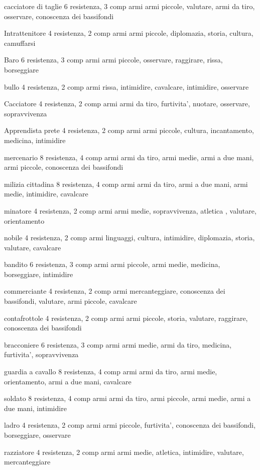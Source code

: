 \documentclass[12pt,a4paper,twoside,openany]{book}
\begin{document}
cacciatore di taglie 6 resistenza, 3 comp armi
armi piccole, valutare, armi da tiro, osservare, conoscenza dei bassifondi

Intrattenitore 4 resistenza, 2 comp armi
armi piccole, diplomazia, storia, cultura, camuffarsi

Baro  6 resistenza, 3 comp armi
armi piccole, osservare, raggirare, rissa, borseggiare

bullo 4 resistenza, 2 comp armi
rissa, intimidire, cavalcare, intimidire,  osservare

Cacciatore 4 resistenza, 2 comp armi
armi da tiro, furtivita', nuotare,  osservare, sopravvivenza

Apprendista prete 4 resistenza, 2 comp armi
armi piccole, cultura, incantamento, medicina, intimidire

mercenario 8 resistenza, 4 comp armi
armi da tiro, armi medie, armi a due mani, armi piccole, conoscenza dei bassifondi

milizia cittadina   8 resistenza, 4 comp armi
armi da tiro, armi a due mani, armi medie, intimidire, cavalcare

minatore  4 resistenza, 2 comp armi
armi medie, sopravvivenza, atletica , valutare, orientamento

nobile 4 resistenza, 2 comp armi
linguaggi, cultura, intimidire,  diplomazia, storia, valutare, cavalcare

bandito  6 resistenza, 3 comp armi
armi piccole, armi medie, medicina, borseggiare, intimidire

commerciante  4 resistenza, 2 comp armi
mercanteggiare, conoscenza dei bassifondi, valutare, armi piccole, cavalcare

contafrottole  4 resistenza, 2 comp armi
armi piccole, storia, valutare, raggirare, conoscenza dei bassifondi

bracconiere  6 resistenza, 3 comp armi
armi medie, armi da tiro, medicina, furtivita', sopravvivenza

guardia a cavallo 8 resistenza, 4 comp armi
armi da tiro, armi medie, orientamento, armi a due mani, cavalcare

soldato 8 resistenza, 4 comp armi
armi da tiro, armi piccole, armi medie, armi a due mani, intimidire

ladro  4 resistenza, 2 comp armi
armi piccole, furtivita', conoscenza dei bassifondi, borseggiare, osservare

razziatore  4 resistenza, 2 comp armi
armi medie, atletica, intimidire, valutare,  mercanteggiare
\end{document}
